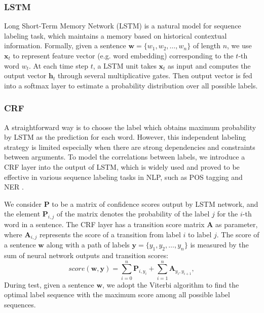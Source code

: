 \documentclass{article}
\begin{document}
\subsubsection{LSTM}
Long Short-Term Memory Network (LSTM) \cite{hochreiter1997long} is a natural model for sequence labeling task, which maintains a memory based on historical contextual information. Formally, given a sentence $\bm{w} = \{w_1, w_2, \dots, w_n\}$ of length $n$, we use $\textbf{x}_t$ to represent feature vector (e.g. word embedding) corresponding to the $t$-th word $w_t$. At each time step $t$, a LSTM unit takes $\textbf{x}_t$ as input and computes the output vector $\textbf{h}_t$ through several multiplicative gates. Then output vector is fed into a softmax layer to estimate a probability distribution over all possible labels.

\subsubsection{CRF}
A straightforward way is to choose the label which obtains maximum probability by LSTM as the prediction for each word. However, this independent labeling strategy is limited especially when there are strong dependencies and constraints between arguments.
To model the correlations between labels, we introduce a CRF layer into the output of LSTM, which is widely used and proved to be effective in various sequence labeling tasks in NLP, such as POS tagging and NER \cite{collobert2011natural,huang2015bidirectional,lample2016neural}.

We consider $\textbf{P}$ to be a matrix of confidence scores output by LSTM network, and the element $\textbf{P}_{i,j}$ of the matrix denotes the probability of the label $j$ for the $i$-th word in a sentence. The CRF layer has a transition score matrix $\textbf{A}$ as parameter, where $\textbf{A}_{i,j}$ represents the score of a transition from label $i$ to label $j$. The score of a sentence $\bm{w}$ along with a path of labels $\bm{y} = \{y_1, y_2, \ldots, y_n\}$ is measured by the sum of neural network outputs and transition scores: 
\begin{equation}
	score(\bm{w}, \bm{y}) = \sum\limits_{i=0}^n\textbf{P}_{i, y_i} + \sum\limits_{i=1}^n\textbf{A}_{y_i, y_{i+1}},
\end{equation}
During test, given a sentence $\bm{w}$, we adopt the Viterbi algorithm \cite{rabiner1989tutorial} to find the optimal label sequence with the maximum score among all possible label sequences.
\end{document}
